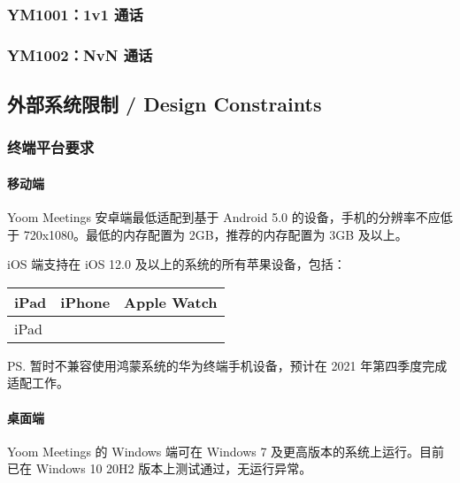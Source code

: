 \documentclass[]{ctexart}
\let\oldparagraph\paragraph
\renewcommand{\paragraph}[1]{\oldparagraph{#1}\mbox{}}
\begin{document}
\hypertarget{ym10011v1-ux901aux8bdd-2}{%
\subsubsection{YM1001：1v1 通话}\label{ym10011v1-ux901aux8bdd-2}}

\hypertarget{ym1002nvn-ux901aux8bdd-2}{%
\subsubsection{YM1002：NvN 通话}\label{ym1002nvn-ux901aux8bdd-2}}

\hypertarget{ux5916ux90e8ux7cfbux7edfux9650ux5236--design-constraints}{%
\subsection{外部系统限制 / Design
Constraints}\label{ux5916ux90e8ux7cfbux7edfux9650ux5236--design-constraints}}

\hypertarget{ux7ec8ux7aefux5e73ux53f0ux8981ux6c42}{%
\subsubsection{终端平台要求}\label{ux7ec8ux7aefux5e73ux53f0ux8981ux6c42}}

\hypertarget{ux79fbux52a8ux7aef}{%
\paragraph{移动端}\label{ux79fbux52a8ux7aef}}

Yoom Meetings 安卓端最低适配到基于 Android 5.0
的设备，手机的分辨率不应低于 720x1080。最低的内存配置为
2GB，推荐的内存配置为 3GB 及以上。

iOS 端支持在 iOS 12.0 及以上的系统的所有苹果设备，包括：

\begin{longtable}[]{@{}lll@{}}
\toprule
iPad & iPhone & Apple Watch\tabularnewline
\midrule
\endhead
iPad & &\tabularnewline
\bottomrule
\end{longtable}

PS. 暂时不兼容使用鸿蒙系统的华为终端手机设备，预计在 2021
年第四季度完成适配工作。

\hypertarget{ux684cux9762ux7aef}{%
\paragraph{桌面端}\label{ux684cux9762ux7aef}}

Yoom Meetings 的 Windows 端可在 Windows 7
及更高版本的系统上运行。目前已在 Windows 10 20H2
版本上测试通过，无运行异常。
\end{document}

